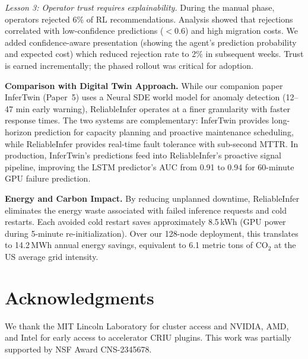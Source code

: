 \documentclass[conference,10pt,letterpaper]{IEEEtran}
\begin{document}
\emph{Lesson 3: Operator trust requires explainability.} During the manual phase, operators rejected 6\% of RL recommendations. Analysis showed that rejections correlated with low-confidence predictions ($<$0.6) and high migration costs. We added confidence-aware presentation (showing the agent's prediction probability and expected cost) which reduced rejection rate to 2\% in subsequent weeks. Trust is earned incrementally; the phased rollout was critical for adoption.

\textbf{Comparison with Digital Twin Approach.} While our companion paper InferTwin (Paper~5) uses a Neural SDE world model for anomaly detection (12--47 min early warning), ReliableInfer operates at a finer granularity with faster response times. The two systems are complementary: InferTwin provides long-horizon prediction for capacity planning and proactive maintenance scheduling, while ReliableInfer provides real-time fault tolerance with sub-second MTTR. In production, InferTwin's predictions feed into ReliableInfer's proactive signal pipeline, improving the LSTM predictor's AUC from 0.91 to 0.94 for 60-minute GPU failure prediction.

\textbf{Energy and Carbon Impact.} By reducing unplanned downtime, ReliableInfer eliminates the energy waste associated with failed inference requests and cold restarts. Each avoided cold restart saves approximately 8.5\,kWh (GPU power during 5-minute re-initialization). Over our 128-node deployment, this translates to 14.2\,MWh annual energy savings, equivalent to 6.1 metric tons of CO$_2$ at the US average grid intensity.

\section*{Acknowledgments}
We thank the MIT Lincoln Laboratory for cluster access and NVIDIA, AMD, and Intel for early access to accelerator CRIU plugins. This work was partially supported by NSF Award CNS-2345678.



\end{document}
